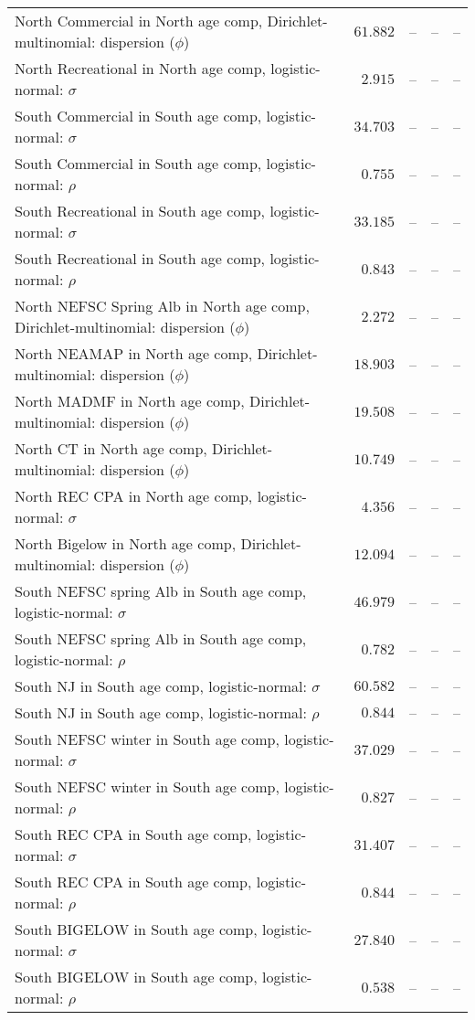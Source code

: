 \documentclass[
]{article}
\begin{document}
\begin{landscape}
\begin{longtable}[t]{lrrrr}
North Commercial in North age comp, Dirichlet-multinomial: dispersion ($\phi$) & $61.882$ & -- & -- & --\\
\addlinespace
North Recreational in North age comp, logistic-normal: $\sigma$ & $2.915$ & -- & -- & --\\
South Commercial in South age comp, logistic-normal: $\sigma$ & $34.703$ & -- & -- & --\\
South Commercial in South age comp, logistic-normal: $\rho$ & $0.755$ & -- & -- & --\\
South Recreational in South age comp, logistic-normal: $\sigma$ & $33.185$ & -- & -- & --\\
South Recreational in South age comp, logistic-normal: $\rho$ & $0.843$ & -- & -- & --\\
\addlinespace
North NEFSC Spring Alb in North age comp, Dirichlet-multinomial: dispersion ($\phi$) & $2.272$ & -- & -- & --\\
North NEAMAP in North age comp, Dirichlet-multinomial: dispersion ($\phi$) & $18.903$ & -- & -- & --\\
North MADMF in North age comp, Dirichlet-multinomial: dispersion ($\phi$) & $19.508$ & -- & -- & --\\
North CT in North age comp, Dirichlet-multinomial: dispersion ($\phi$) & $10.749$ & -- & -- & --\\
North REC CPA in North age comp, logistic-normal: $\sigma$ & $4.356$ & -- & -- & --\\
\addlinespace
North Bigelow in North age comp, Dirichlet-multinomial: dispersion ($\phi$) & $12.094$ & -- & -- & --\\
South NEFSC spring Alb in South age comp, logistic-normal: $\sigma$ & $46.979$ & -- & -- & --\\
South NEFSC spring Alb in South age comp, logistic-normal: $\rho$ & $0.782$ & -- & -- & --\\
South NJ in South age comp, logistic-normal: $\sigma$ & $60.582$ & -- & -- & --\\
South NJ in South age comp, logistic-normal: $\rho$ & $0.844$ & -- & -- & --\\
\addlinespace
South NEFSC winter in South age comp, logistic-normal: $\sigma$ & $37.029$ & -- & -- & --\\
South NEFSC winter in South age comp, logistic-normal: $\rho$ & $0.827$ & -- & -- & --\\
South REC CPA in South age comp, logistic-normal: $\sigma$ & $31.407$ & -- & -- & --\\
South REC CPA in South age comp, logistic-normal: $\rho$ & $0.844$ & -- & -- & --\\
South BIGELOW in South age comp, logistic-normal: $\sigma$ & $27.840$ & -- & -- & --\\
\addlinespace
South BIGELOW in South age comp, logistic-normal: $\rho$ & $0.538$ & -- & -- & --\\*
\end{longtable}
\end{landscape}
\end{document}
